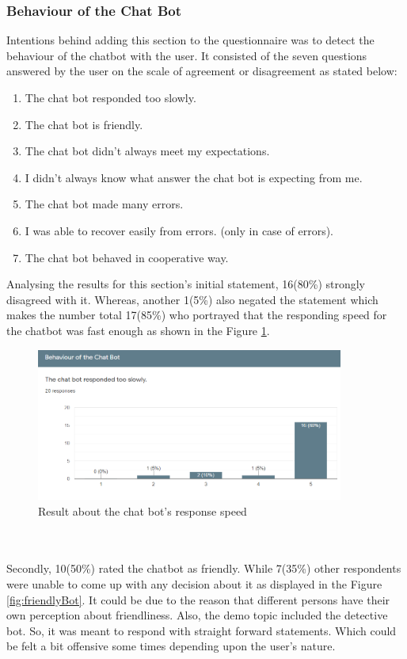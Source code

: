 \subsubsection*{Behaviour of the Chat Bot}
Intentions behind adding this section to the questionnaire was to detect the behaviour of the chatbot with the user. It consisted of the seven questions answered by the user on the scale of agreement or disagreement as stated below: 
\begin{enumerate}
    \item The chat bot responded too slowly.
    \item The chat bot is friendly.
    \item The chat bot didn't always meet my expectations.
    \item I didn't always know what answer the chat bot is expecting from me.
    \item The chat bot made many errors.
    \item I was able to recover easily from errors. (only in case of errors).
    \item The chat bot behaved in cooperative way.
\end{enumerate}
Analysing the results for this section's initial statement, 16(80\%) strongly disagreed with it. Whereas, another 1(5\%) also negated the statement which makes the number total 17(85\%) who portrayed that the responding speed for the chatbot was fast enough as shown in the Figure \ref{fig:respSpeed}. 

\begin{figure}[!h]
    \centering
    \includegraphics[width=0.9\textwidth]{img/Response_Speed.PNG}
    \caption{Result about the chat bot's response speed}
    \label{fig:respSpeed}
\end{figure}
\\~\\
Secondly, 10(50\%) rated the chatbot as friendly. While 7(35\%) other respondents were unable to come up with any decision about it as displayed in the Figure \ref{fig:friendlyBot}. It could be due to the reason that different persons have their own perception about friendliness. Also, the demo topic included the detective bot. So, it was meant to respond with straight forward statements. Which could be felt a bit offensive some times depending upon the user's nature. 

